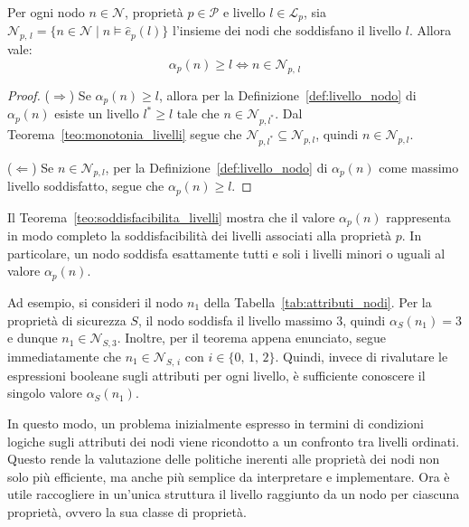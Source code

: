 \begin{theorem}
    \label{teo:soddisfacibilita_livelli}
    Per ogni nodo $n \in \mathcal{N}$, proprietà $p \in \mathcal{P}$ e livello $l \in \mathcal{L}_p$, sia $\mathcal{N}_{p,\,l} = \{ n \in \mathcal{N} \mid n \models \hat{e}_p(l) \}$ l'insieme dei nodi che soddisfano il livello $l$. Allora vale:
    \begin{equation}
        \alpha_p(n) \geq l \iff n \in \mathcal{N}_{p,\,l}
    \end{equation}

    \begin{proof}
        ($\Rightarrow$) Se $\alpha_p(n) \geq l$, allora per la Definizione~\ref{def:livello_nodo} di $\alpha_p(n)$ esiste un livello $l^* \geq l$ tale che $n \in \mathcal{N}_{p,l^*}$. Dal Teorema~\ref{teo:monotonia_livelli} segue che $\mathcal{N}_{p,l^*} \subseteq \mathcal{N}_{p,l}$, quindi $n \in \mathcal{N}_{p,l}$.
        
        ($\Leftarrow$) Se $n \in \mathcal{N}_{p,l}$, per la Definizione~\ref{def:livello_nodo} di $\alpha_p(n)$ come massimo livello soddisfatto, segue che $\alpha_p(n) \geq l$.
    \end{proof}
\end{theorem}

Il Teorema~\ref{teo:soddisfacibilita_livelli} mostra che il valore $\alpha_p(n)$ rappresenta in modo completo la soddisfacibilità dei livelli associati alla proprietà $p$. In particolare, un nodo soddisfa esattamente tutti e soli i livelli minori o uguali al valore $\alpha_p(n)$. 

Ad esempio, si consideri il nodo $n_1$ della Tabella~\ref{tab:attributi_nodi}. Per la proprietà di sicurezza $S$, il nodo soddisfa il livello massimo $3$, quindi $\alpha_S(n_1) = 3$ e dunque $n_1 \in \mathcal{N}_{S,3}$. Inoltre, per il teorema appena enunciato, segue immediatamente che $n_1 \in \mathcal{N}_{S,\,i}$ con $i \in \{0,\, 1,\, 2\}$. Quindi, invece di rivalutare le espressioni booleane sugli attributi per ogni livello, è sufficiente conoscere il singolo valore $\alpha_S(n_1)$.

In questo modo, un problema inizialmente espresso in termini di condizioni logiche sugli attributi dei nodi viene ricondotto a un confronto tra livelli ordinati. Questo rende la valutazione delle politiche inerenti alle proprietà dei nodi non solo più efficiente, ma anche più semplice da interpretare e implementare. Ora è utile raccogliere in un'unica struttura il livello raggiunto da un nodo per ciascuna proprietà, ovvero la sua classe di proprietà.

